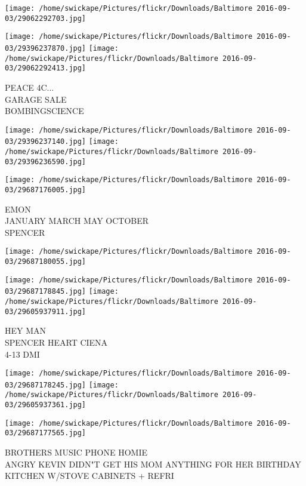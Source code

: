 \documentclass[10pt,letterpaper]{article}
\begin{document}
\texttt{[image: /home/swickape/Pictures/flickr/Downloads/Baltimore 2016-09-03/29062292703.jpg]}

\vspace{0.25in}
\texttt{[image: /home/swickape/Pictures/flickr/Downloads/Baltimore 2016-09-03/29396237870.jpg]}
\texttt{[image: /home/swickape/Pictures/flickr/Downloads/Baltimore 2016-09-03/29062292413.jpg]}

PEACE 4C...\\
GARAGE SALE\\
BOMBINGSCIENCE
\pagebreak

\texttt{[image: /home/swickape/Pictures/flickr/Downloads/Baltimore 2016-09-03/29396237140.jpg]}
\texttt{[image: /home/swickape/Pictures/flickr/Downloads/Baltimore 2016-09-03/29396236590.jpg]}

\texttt{[image: /home/swickape/Pictures/flickr/Downloads/Baltimore 2016-09-03/29687176005.jpg]}

EMON\\
JANUARY MARCH MAY OCTOBER\\
SPENCER
\pagebreak

\texttt{[image: /home/swickape/Pictures/flickr/Downloads/Baltimore 2016-09-03/29687180055.jpg]}

\vspace{0.25in}
\texttt{[image: /home/swickape/Pictures/flickr/Downloads/Baltimore 2016-09-03/29687178845.jpg]}
\texttt{[image: /home/swickape/Pictures/flickr/Downloads/Baltimore 2016-09-03/29605937911.jpg]}

HEY MAN\\
SPENCER HEART CIENA\\
4{-}13 DMI
\pagebreak

\texttt{[image: /home/swickape/Pictures/flickr/Downloads/Baltimore 2016-09-03/29687178245.jpg]}
\texttt{[image: /home/swickape/Pictures/flickr/Downloads/Baltimore 2016-09-03/29605937361.jpg]}

\vspace{0.25in}
\texttt{[image: /home/swickape/Pictures/flickr/Downloads/Baltimore 2016-09-03/29687177565.jpg]}

BROTHERS MUSIC PHONE HOMIE\\
ANGRY KEVIN DIDN"T GET HIS MOM ANYTHING FOR HER BIRTHDAY\\
KITCHEN W/STOVE CABINETS + REFRI
\pagebreak
\end{document}
